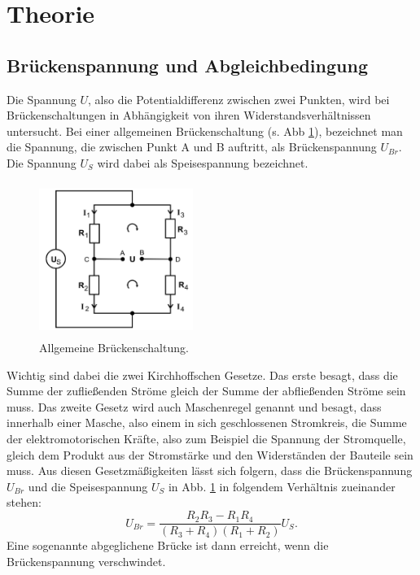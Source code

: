 \section{Theorie} %
\label{sec:Theorie}

\subsection{Brückenspannung und Abgleichbedingung}
Die Spannung $U$, also die Potentialdifferenz zwischen zwei Punkten, wird bei Brückenschaltungen in Abhängigkeit von ihren 
Widerstandsverhältnissen untersucht.
Bei einer allgemeinen Brückenschaltung (s. Abb \ref{allgemein}), bezeichnet man die Spannung, die zwischen Punkt A und B auftritt, als Brückenspannung $U_{Br}$. 
Die Spannung $U_S$ wird dabei als Speisespannung bezeichnet.
\begin{figure}
    \centering
    \includegraphics[width=5cm, height=5cm]{build/allgemein.png}
    \caption{Allgemeine Brückenschaltung.}
    \label{allgemein}
\end{figure}
\noindent Wichtig sind dabei die  zwei Kirchhoffschen Gesetze. 
Das erste besagt, dass die Summe der zufließenden Ströme gleich der Summe der abfließenden Ströme sein muss. 
Das zweite Gesetz wird auch Maschenregel genannt und besagt, dass innerhalb einer Masche, also einem in sich geschlossenen Stromkreis, die Summe der 
elektromotorischen Kräfte, also zum Beispiel die Spannung der Stromquelle, gleich dem Produkt aus %
der Stromstärke und den Widerständen der Bauteile sein muss. 
\newline
Aus diesen Gesetzmäßigkeiten lässt sich folgern, dass die Brückenspannung $U_{Br}$ und die Speisespannung $U_S$ in Abb. \ref{allgemein} in folgendem Verhältnis 
zueinander stehen:
\begin{equation*}
    U_{Br} = \frac{R_2R_3 - R_1R_4}{(R_3 + R_4)(R_1 + R_2)}U_S.
\end{equation*}
Eine sogenannte abgeglichene Brücke ist dann erreicht, wenn die Brückenspannung verschwindet.
